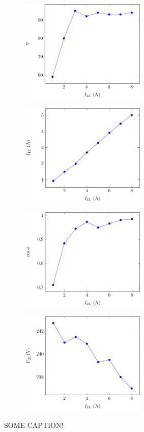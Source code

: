 \begin{figure}[H]
    \centering
	\begin{subfigure}{6cm}
	  \centering\includegraphics[width=6cm]{fig/r_eta.pdf}
	\end{subfigure}
	\begin{subfigure}{6cm}
	  \centering\includegraphics[width=6cm]{fig/r_i1i2.pdf}
	\end{subfigure}

	\begin{subfigure}{6cm}
	  \centering\includegraphics[width=6cm]{fig/r_pf.pdf}
	\end{subfigure}
	\begin{subfigure}{6cm}
	  \centering\includegraphics[width=6cm]{fig/r_u2i2.pdf}
	\end{subfigure}
	\caption{SOME CAPTION!}
  \end{figure}

